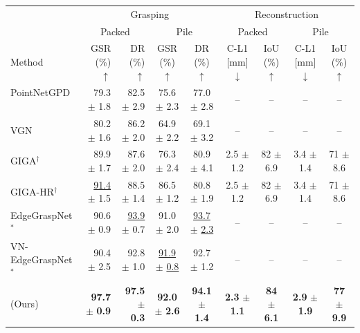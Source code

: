 \begin{table}[t!]
    \setlength{\tabcolsep}{6pt}
    \centering
    \begin{tabular}{lrr|cc||cc|cc}
    \toprule
         &  \multicolumn{4}{c||}{Grasping} & \multicolumn{4}{c}{Reconstruction} \\
         &  \multicolumn{2}{c}{Packed}& \multicolumn{2}{c||}{Pile}&\multicolumn{2}{c}{Packed}& \multicolumn{2}{c}{Pile} 
        \\ Method &  GSR (\%) $\uparrow$ & DR (\%) $\uparrow$  &GSR (\%) $\uparrow$ & DR (\%) $\uparrow$ & C-L1 [mm] $\downarrow$ & IoU (\%) $\uparrow$ & C-L1 [mm] $\downarrow$ & IoU (\%) $\uparrow$ \\ \midrule
        PointNetGPD ~\cite{liang2019pointnetgpd}&  79.3 $\pm$ 1.8 & 82.5  $\pm$  2.9 &  75.6  $\pm$  2.3 & 77.0 $\pm$  2.8 & -- & --  & -- & --\\
        VGN~\cite{Breyer2021VolumetricGN} &   80.2  $\pm$  1.6 & 86.2  $\pm$  2.0  & 64.9  $\pm$  2.2 & 69.1  $\pm$  3.2  &-- & -- & -- & -- \\
        GIGA$^\dagger$~\cite{Jiang2021SynergiesBA} & 89.9 $\pm$ 1.7 & 87.6 $\pm$ 2.0  &76.3 $\pm$ 2.4 & 80.9 $\pm$ 4.1  &  2.5 $\pm$ 1.2  & {82} $\pm$ 6.9 &  3.4 $\pm$ 1.4 &  71 $\pm$ 8.6   \\  
        GIGA-HR$^\dagger$~\cite{Jiang2021SynergiesBA} & \underline{91.4} $\pm$ 1.5 & 88.5 $\pm$ 1.4  & 86.5 $\pm$ 1.2& 80.8 $\pm$ 1.9 &  2.5 $\pm$ 1.2  & {82} $\pm$ 6.9 &  3.4 $\pm$ 1.4 &  71 $\pm$  8.6    \\  
EdgeGraspNet$^*$\cite{huang2022edge} & 90.6 $\pm$ 0.9 & \underline{93.9} $\pm$ 0.7 & 91.0 $\pm$ 2.0 & \underline{93.7} $\pm$ \underline{2.3}& -- & --  & -- & -- \\ 

 VN-EdgeGraspNet$^*$\cite{huang2022edge} & 90.4 $\pm$ 2.5 & 92.8 $\pm$ 1.0  & \underline{91.9} $\pm$ \underline{0.8} & 92.7 $\pm$ {1.2} & -- & --  & -- & -- \\
  
 
 \OurMethod{} (Ours) & \textbf{97.7}	$\pm$ \textbf{0.9} & \textbf{97.5} $\pm$ \textbf{0.3} & \textbf{92.0} $\pm$ \textbf{2.6}
 & \textbf{94.1} $\pm$ \textbf{1.4}&  \textbf{2.3} $\pm$ \textbf{1.1} & \textbf{84} $\pm$ \textbf{6.1}&  \textbf{2.9} $\pm$ \textbf{1.9} & \textbf{77} $\pm$ \textbf{9.9}  \\  
 

\end{tabular}
\end{table}
